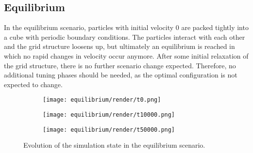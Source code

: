 \newcommand{\fastcolorbarhor}{%
	\centering
	\begin{tikzpicture}
		\node[anchor=east, align=center] at (-0.25cm,-0.25cm) {\si{F^{*}}};
		\pgfplotscolorbardrawstandalone[
			colorbar horizontal,
			colormap name=fast,
			point meta min=0,
			point meta max=50,
			colorbar style={
					width=3cm,
					xtick={0,10,...,50},
					tick align=outside,
					tick pos=top,
					xticklabel pos=top,
				},
		]
	\end{tikzpicture}
}


\subsection{Equilibrium}
\label{subsec:equil}
In the equilibrium scenario, particles with initial velocity $0$ are packed tightly into a cube with periodic boundary conditions. The particles interact with each other and the grid structure loosens up, but ultimately an equilibrium is reached in which no rapid changes in velocity occur anymore. After some initial relaxation of the grid structure, there is no further scenario change expected. Therefore, no additional tuning phases should be needed, as the optimal configuration is not expected to change.


\begin{figure}[htpb]
	\centering
	\begin{subfigure}[c]{.3\textwidth}
		\texttt{[image: equilibrium/render/t0.png]}
	\end{subfigure}%
	\begin{subfigure}[c]{.3\textwidth}
		\texttt{[image: equilibrium/render/t10000.png]}
	\end{subfigure}%
	\begin{subfigure}[c]{.3\textwidth}
		\texttt{[image: equilibrium/render/t50000.png]}
	\end{subfigure}%
	\hfill\begin{subfigure}[c]{.08\textwidth}
		\fastcolorbar
	\end{subfigure}
	\label{fig:evolution_equil}
	\caption{Evolution of the simulation state in the equilibrium scenario.}
\end{figure}



